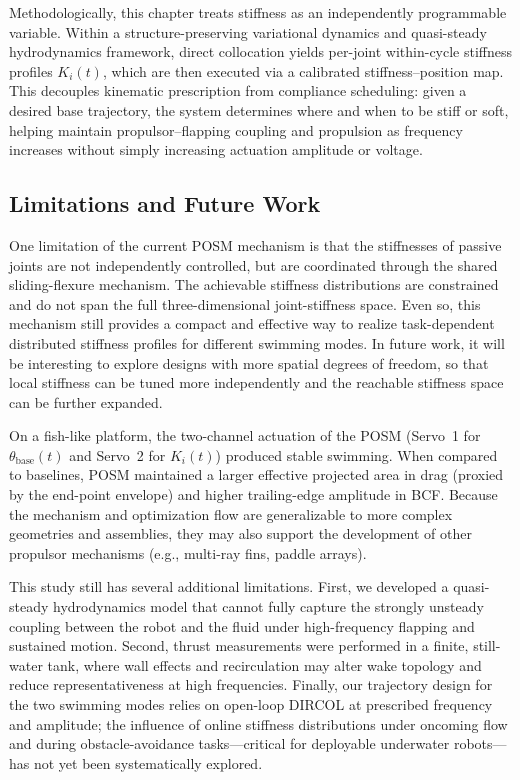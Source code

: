 Methodologically, this chapter treats stiffness as an independently programmable variable. Within a structure-preserving variational dynamics and quasi-steady hydrodynamics framework, direct collocation yields per-joint within-cycle stiffness profiles \(K_i(t)\), which are then executed via a calibrated stiffness--position map. This decouples kinematic prescription from compliance scheduling: given a desired base trajectory, the system determines where and when to be stiff or soft, helping maintain propulsor--flapping coupling and propulsion as frequency increases without simply increasing actuation amplitude or voltage.

\subsection{Limitations and Future Work}

One limitation of the current POSM mechanism is that the stiffnesses of passive joints are not independently controlled, but are coordinated through the shared sliding-flexure mechanism. The achievable stiffness distributions are constrained and do not span the full three-dimensional joint-stiffness space. Even so, this mechanism still provides a compact and effective way to realize task-dependent distributed stiffness profiles for different swimming modes. In future work, it will be interesting to explore designs with more spatial degrees of freedom, so that local stiffness can be tuned more independently and the reachable stiffness space can be further expanded.

On a fish-like platform, the two-channel actuation of the POSM (Servo~1 for $\theta_{\mathrm{base}}(t)$ and Servo~2 for $K_i(t)$) produced stable swimming. When compared to baselines, POSM maintained a larger effective projected area in drag (proxied by the end-point envelope) and higher trailing-edge amplitude in BCF. Because the mechanism and optimization flow are generalizable to more complex geometries and assemblies, they may also support the development of other propulsor mechanisms (e.g., multi-ray fins, paddle arrays).

This study still has several additional limitations. First, we developed a quasi-steady hydrodynamics model that cannot fully capture the strongly unsteady coupling between the robot and the fluid under high-frequency flapping and sustained motion. Second, thrust measurements were performed in a finite, still-water tank, where wall effects and recirculation may alter wake topology and reduce representativeness at high frequencies. Finally, our trajectory design for the two swimming modes relies on open-loop DIRCOL at prescribed frequency and amplitude; the influence of online stiffness distributions under oncoming flow and during obstacle-avoidance tasks---critical for deployable underwater robots---has not yet been systematically explored.

